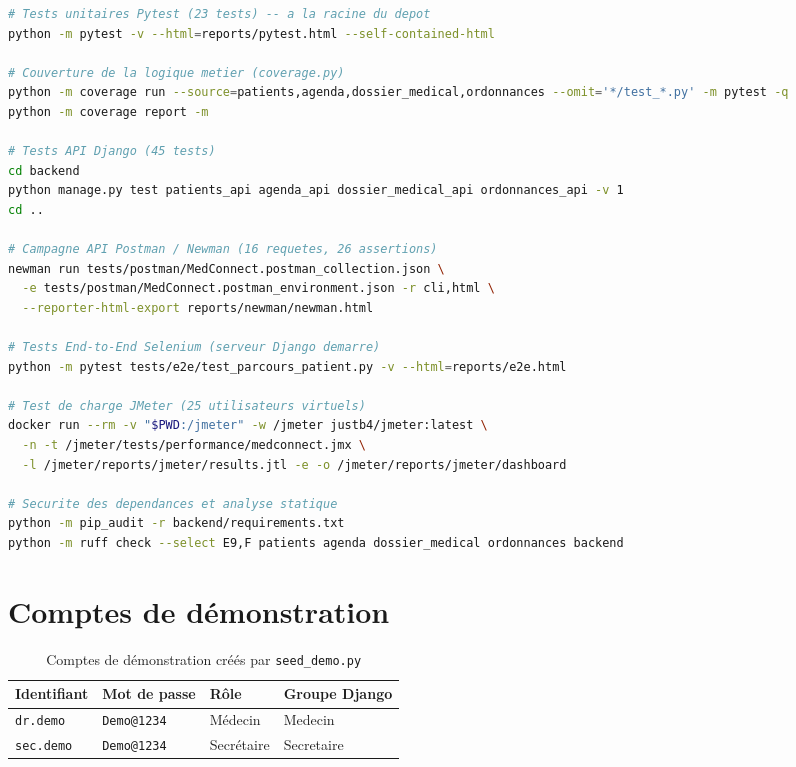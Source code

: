 \documentclass[12pt,a4paper]{report}
\begin{document}
\begin{lstlisting}[language=bash, caption={Lancement de la suite de tests complète}]
# Tests unitaires Pytest (23 tests) -- a la racine du depot
python -m pytest -v --html=reports/pytest.html --self-contained-html

# Couverture de la logique metier (coverage.py)
python -m coverage run --source=patients,agenda,dossier_medical,ordonnances --omit='*/test_*.py' -m pytest -q
python -m coverage report -m

# Tests API Django (45 tests)
cd backend
python manage.py test patients_api agenda_api dossier_medical_api ordonnances_api -v 1
cd ..

# Campagne API Postman / Newman (16 requetes, 26 assertions)
newman run tests/postman/MedConnect.postman_collection.json \
  -e tests/postman/MedConnect.postman_environment.json -r cli,html \
  --reporter-html-export reports/newman/newman.html

# Tests End-to-End Selenium (serveur Django demarre)
python -m pytest tests/e2e/test_parcours_patient.py -v --html=reports/e2e.html

# Test de charge JMeter (25 utilisateurs virtuels)
docker run --rm -v "$PWD:/jmeter" -w /jmeter justb4/jmeter:latest \
  -n -t /jmeter/tests/performance/medconnect.jmx \
  -l /jmeter/reports/jmeter/results.jtl -e -o /jmeter/reports/jmeter/dashboard

# Securite des dependances et analyse statique
python -m pip_audit -r backend/requirements.txt
python -m ruff check --select E9,F patients agenda dossier_medical ordonnances backend
\end{lstlisting}

\section{Comptes de démonstration}

\begin{table}[H]
\centering
\caption{Comptes de démonstration créés par \texttt{seed\_demo.py}}
\renewcommand{\arraystretch}{1.4}
\begin{tabular}{|p{3.5cm}|p{3.5cm}|p{3.5cm}|p{3cm}|}
  \hline
  \rowcolor{medaccent}
  \textbf{Identifiant} & \textbf{Mot de passe} & \textbf{Rôle} & \textbf{Groupe Django} \\
  \hline
  \texttt{dr.demo} & \texttt{Demo@1234} & Médecin & Medecin \\
  \hline
  \texttt{sec.demo} & \texttt{Demo@1234} & Secrétaire & Secretaire \\
  \hline
\end{tabular}
\end{table}
\end{document}
